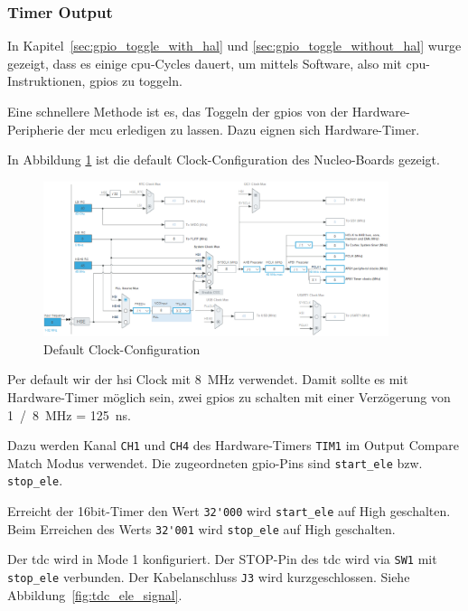 \documentclass[11pt,a4paper,hidelinks]{article}
\begin{document}
\subsubsection{Timer Output}\label{sec:timer_output}

In Kapitel~\ref{sec:gpio_toggle_with_hal} und \ref{sec:gpio_toggle_without_hal} wurge gezeigt, dass es einige
\acrshort{cpu}-Cycles dauert, um  mittels Software, also mit \acrshort{cpu}-Instruktionen, \acrshort{gpio}s zu toggeln.

Eine schnellere Methode ist es, das Toggeln der \acrshort{gpio}s von der Hardware-Peripherie der \acrshort{mcu}
erledigen zu lassen. Dazu eignen sich Hardware-Timer.

In Abbildung \ref{fig:clock_config_default} ist die default Clock-Configuration des Nucleo-Boards gezeigt.

\begin{figure}[H]
    \centering
    \includegraphics[width=0.9\textwidth]{graphics/clock_config_default.png}
    \caption{Default Clock-Configuration}\label{fig:clock_config_default}
\end{figure}

Per default wir der \acrfull{hsi} Clock mit 8~MHz verwendet. Damit sollte es mit Hardware-Timer möglich sein, zwei
\acrshort{gpio}s zu schalten mit einer Verzögerung von 1~/~8~MHz = 125~ns.

Dazu werden Kanal \lstinline|CH1| und \lstinline|CH4| des Hardware-Timers \lstinline|TIM1| im Output Compare Match Modus
verwendet. Die zugeordneten \acrshort{gpio}-Pins sind \lstinline|start_ele| bzw. \lstinline|stop_ele|.

Erreicht der 16bit-Timer den Wert \lstinline|32'000| wird \lstinline|start_ele| auf High geschalten. Beim Erreichen des
Werts \lstinline|32'001| wird \lstinline|stop_ele| auf High geschalten.

Der \acrshort{tdc} wird in Mode 1 konfiguriert. Der STOP-Pin des \acrshort{tdc} wird via \lstinline|SW1| mit
\lstinline|stop_ele| verbunden. Der Kabelanschluss \lstinline|J3| wird kurzgeschlossen. Siehe
Abbildung~\ref{fig:tdc_ele_signal}.
\end{document}
